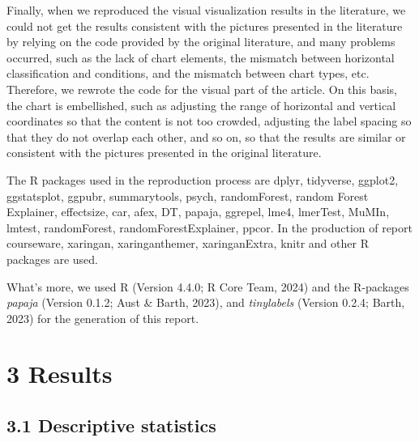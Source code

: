 \documentclass[
  man,floatsintext]{apa6}
\begin{document}
Finally, when we reproduced the visual visualization results in the literature, we could not get the results consistent with the pictures presented in the literature by relying on the code provided by the original literature, and many problems occurred, such as the lack of chart elements, the mismatch between horizontal classification and conditions, and the mismatch between chart types, etc. Therefore, we rewrote the code for the visual part of the article. On this basis, the chart is embellished, such as adjusting the range of horizontal and vertical coordinates so that the content is not too crowded, adjusting the label spacing so that they do not overlap each other, and so on, so that the results are similar or consistent with the pictures presented in the original literature.

The R packages used in the reproduction process are dplyr, tidyverse, ggplot2, ggstatsplot, ggpubr, summarytools, psych, randomForest, random Forest Explainer, effectsize, car, afex, DT, papaja, ggrepel, lme4, lmerTest, MuMIn, lmtest, randomForest, randomForestExplainer, ppcor. In the production of report courseware, xaringan, xaringanthemer, xaringanExtra, knitr and other R packages are used.

What's more, we used R (Version 4.4.0; R Core Team, 2024) and the R-packages \emph{papaja} (Version 0.1.2; Aust \& Barth, 2023), and \emph{tinylabels} (Version 0.2.4; Barth, 2023) for the generation of this report.

\section{3 Results}\label{results}

\subsection{3.1 Descriptive statistics}\label{descriptive-statistics}
\end{document}
